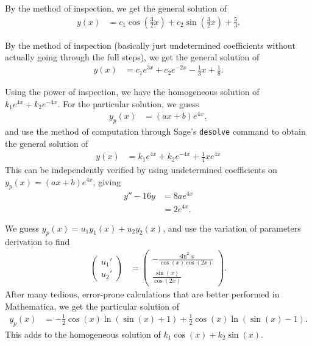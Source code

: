 \documentclass[10pt]{mypackage}
\begin{document}
\renewcommand{\arraystretch}{1.5}
\RaggedRight
\begin{solution}[4.4, Problem 2]
  By the method of inspection, we get the general solution of
  \begin{align*}
    y(x) &= c_1\cos\left( \frac{3}{2}x \right) + c_2\sin\left( \frac{3}{2}x \right) + \frac{5}{3}.
  \end{align*}
\end{solution}
\begin{solution}[4.4, Problem 4]
  By the method of inspection (basically just undetermined coefficients without actually going through the full steps), we get the general solution of
  \begin{align*}
    y(x) &= c_1e^{3x} + c_2 e^{-2x} - \frac{1}{3}x + \frac{1}{8}.
  \end{align*}
\end{solution}
\begin{solution}[4.4, Problem 12]
  Using the power of inspection, we have the homogeneous solution of $k_1e^{4x} + k_2e^{-4x}$. For the particular solution, we guess 
  \begin{align*}
    y_p(x) &= \left( ax + b \right)e^{4x},
  \end{align*}
  and use the method of computation through Sage's \texttt{desolve} command to obtain the general solution of
  \begin{align*}
    y(x) &= k_1e^{4x} + k_2e^{-4x} + \frac{1}{4}xe^{4x}
  \end{align*}
  This can be independently verified by using undetermined coefficients on $y_p(x) = \left( ax + b \right)e^{4x}$, giving
  \begin{align*}
    y''-16y &= 8ae^{4x}\\
            &= 2e^{4x}.
  \end{align*}
\end{solution}
\begin{solution}[4.6, Problem 2]
  We guess $y_p(x) = u_1y_1(x) + u_2y_2(x)$, and use the variation of parameters derivation to find
  \begin{align*}
    \begin{pmatrix}u_1' \\ u_2'\end{pmatrix} &= \begin{pmatrix} - \frac{\sin^2 x}{\cos(x)\cos(2x)} \\ \frac{\sin(x)}{\cos\left( 2x \right)}\end{pmatrix}.
  \end{align*}
  After many tedious, error-prone calculations that are better performed in Mathematica, we get the particular solution of
  \begin{align*}
    y_p(x) &= -\frac{1}{2}\cos\left( x \right)\ln\left( \sin\left( x \right)  + 1\right) + \frac{1}{2}\cos(x)\ln\left( \sin(x) - 1 \right).
  \end{align*}
  This adds to the homogeneous solution of $k_1\cos(x) + k_2\sin(x)$.
\end{solution}
\end{document}

